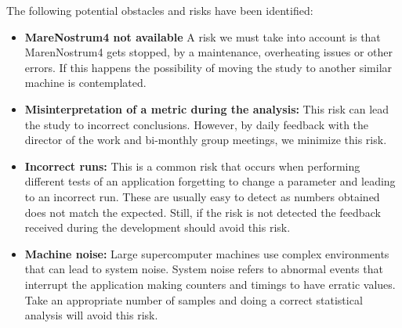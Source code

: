 \justify
The following potential obstacles and risks have been identified:
\begin{itemize}
  \item \textbf{MareNostrum4 not available} A risk we must take into account is that MarenNostrum4 gets stopped, by a maintenance, overheating issues or other errors. If this happens the possibility of moving the study to another similar machine is contemplated.
  \item \textbf{Misinterpretation of a metric during the analysis:} This risk can lead the study to incorrect conclusions. However, by daily feedback with the director of the work and bi-monthly group meetings, we minimize this risk.

  \item \textbf{Incorrect runs:} This is a common risk that occurs when performing different tests of an application forgetting to change a parameter and leading to an incorrect run. These are usually easy to detect as numbers obtained does not match the expected. Still, if the risk is not detected the feedback received during the development should avoid this risk.

  \item \textbf{Machine noise:} Large supercomputer machines use complex environments that can lead to system noise. System noise refers to abnormal events that interrupt the application making counters and timings to have erratic values. Take an appropriate number of samples and doing a correct statistical analysis will avoid this risk.

\end{itemize}

